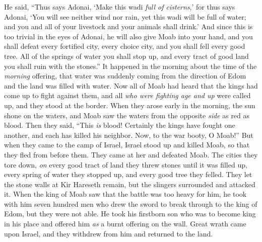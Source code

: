\begin{biblechapter}
\verse He said, “Thus says Adonai, ‘Make this wadi \textit{full of cisterns},’
\verse for thus says Adonai, ‘You will see neither wind nor rain, yet this wadi will be full of water; and you and all of your livestock and your animals shall drink.’
\verse And since this is too trivial in the eyes of Adonai, he will also give Moab into your hand,
\verse and you shall defeat every fortified city, every choice city, and you shall fell every good tree. All of the springs of water you shall stop up, and every tract of good land you shall ruin with the stones.”
\verse It happened in the morning about the time of the \textit{morning} offering, that water was suddenly coming from the direction of Edom and the land was filled with water.
\verse Now all of Moab had heard that the kings had come up to fight against them, and all \textit{who were fighting age and up} were called up, and they stood at the border.
\verse When they arose early in the morning, the sun shone on the waters, and Moab saw the waters from the opposite \textit{side} as red as blood.
\verse Then they said, “This \textit{is} blood! Certainly the kings have fought one another, and each has killed his neighbor. Now, to the war booty, O Moab!”
\verse But when they came to the camp of Israel, Israel stood up and killed Moab, so that they fled from before them. They came at her and defeated Moab.
\verse The cities they tore down, \textit{on} every good tract of land they threw stones until it was filled up, every spring of water they stopped up, and every good tree they felled. They let the stone walls at Kir Hareseth remain, but the slingers surrounded and attacked it.
\verse When the king of Moab saw that the battle was too heavy for him, he took with him seven hundred men who drew the sword to break through to the king of Edom, but they were not able.
\verse He took his firstborn son who was to become king in his place and offered him \textit{as} a burnt offering on the wall. Great wrath came upon Israel, and they withdrew from him and returned to the land.
\end{biblechapter}

